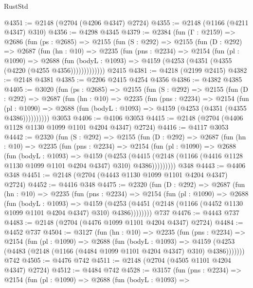 \begin{lexlean}{RustStd}
\begin{coremodule}
@4351 := @2148 (@2704 (@4206 @4347) @2724)
@4355 := @2148 (@1166 (@4211 @4347) @310)
@4356 := @4298 @4345
@4379 := @2384
    (fun (Γ : @2159) =>
    @2686
      (fun (ps : @2685) =>
      @2155
        (fun (S : @292) =>
        @2155
          (fun (D : @292) =>
          @2687
            (fun (hn : @10) =>
            @2235
              (fun (pns : @2234) =>
              @2154
                (fun (pl : @1090) =>
                @2688
                  (fun (bodyL : @1093) =>
                  @4159 (@4253 (@4351 (@4355 (@4220 (@4255 @4356)))))))))))))
    @2415
@4381 := @4218 (@2199 @2415)
@4382 := @2148 @4381
@4385 := @2206 @2415 @4254 @4356
@4386 := @4382 @4385
@4405 := @3020
    (fun (ps : @2685) =>
    @2155
      (fun (S : @292) =>
      @2155
        (fun (D : @292) =>
        @2687
          (fun (hn : @10) =>
          @2235
            (fun (pns : @2234) =>
            @2154
              (fun (pl : @1090) =>
              @2688 (fun (bodyL : @1093) => @4159 (@4253 (@4351 (@4355 @4386))))))))))
    @3053
@4406 := @4106 @3053
@4415 := @2148 (@2704 (@4406 @1128 @1130 @1099 @1101 @4204 @4347) @2724)
@4416 := @4117 @3053
@4442 := @2320
    (fun (S : @292) =>
    @2155
      (fun (D : @292) =>
      @2687
        (fun (hn : @10) =>
        @2235
          (fun (pns : @2234) =>
          @2154
            (fun (pl : @1090) =>
            @2688
              (fun (bodyL : @1093) =>
              @4159
                (@4253
                  (@4415
                    (@2148 (@1166 (@4416 @1128 @1130 @1099 @1101 @4204 @4347) @310) @4386)))))))))
    @348
@4443 := @4406 @348
@4451 := @2148 (@2704 (@4443 @1130 @1099 @1101 @4204 @4347) @2724)
@4452 := @4416 @348
@4475 := @2320
    (fun (D : @292) =>
    @2687
      (fun (hn : @10) =>
      @2235
        (fun (pns : @2234) =>
        @2154
          (fun (pl : @1090) =>
          @2688
            (fun (bodyL : @1093) =>
            @4159
              (@4253 (@4451 (@2148 (@1166 (@4452 @1130 @1099 @1101 @4204 @4347) @310) @4386))))))))
    @737
@4476 := @4443 @737
@4483 := @2148 (@2704 (@4476 @1099 @1101 @4204 @4347) @2724)
@4484 := @4452 @737
@4504 := @3127
    (fun (hn : @10) =>
    @2235
      (fun (pns : @2234) =>
      @2154
        (fun (pl : @1090) =>
        @2688
          (fun (bodyL : @1093) =>
          @4159 (@4253 (@4483 (@2148 (@1166 (@4484 @1099 @1101 @4204 @4347) @310) @4386)))))))
    @742
@4505 := @4476 @742
@4511 := @2148 (@2704 (@4505 @1101 @4204 @4347) @2724)
@4512 := @4484 @742
@4528 := @3157
    (fun (pns : @2234) =>
    @2154
      (fun (pl : @1090) =>
      @2688
        (fun (bodyL : @1093) =>

\end{coremodule}
\end{lexlean}

